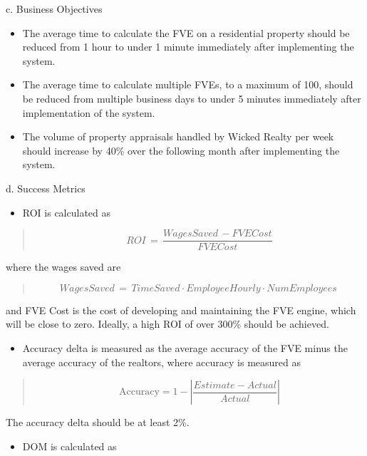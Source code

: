 \documentclass[
]{article}
\begin{document}
c. Business Objectives

\begin{itemize}
\item
  The average time to calculate the FVE on a residential property should
  be reduced from 1 hour to under 1 minute immediately after
  implementing the system.
\item
  The average time to calculate multiple FVEs, to a maximum of 100,
  should be reduced from multiple business days to under 5 minutes
  immediately after implementation of the system.
\item
  The volume of property appraisals handled by Wicked Realty per week
  should increase by 40\% over the following month after implementing
  the system.
\end{itemize}

d. Success Metrics

\begin{itemize}
\item
  ROI is calculated as
\end{itemize}

\begin{quote}
\[ROI\, = \,\frac{WagesSaved\, - FVECost}{FVECost}\]
\end{quote}

where the wages saved are

\begin{quote}
\[WagesSaved\, = \, TimeSaved \cdot EmployeeHourly \cdot NumEmployees\ \]
\end{quote}

and FVE Cost is the cost of developing and maintaining the FVE engine,
which will be close to zero. Ideally, a high ROI of over 300\% should be
achieved.

\begin{itemize}
\item
  Accuracy delta is measured as the average accuracy of the FVE minus
  the average accuracy of the realtors, where accuracy is measured as
\end{itemize}

\begin{quote}
\[\text{Accuracy} = 1 - \left| \frac{Estimate - Actual}{Actual} \right|\]
\end{quote}

The accuracy delta should be at least 2\%.

\begin{itemize}
\item
  DOM is calculated as
\end{itemize}
\end{document}
